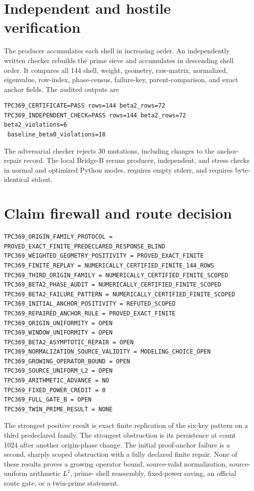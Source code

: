 \documentclass[10pt]{article}
\begin{document}
\section{Independent and hostile verification}

The producer accumulates each shell in increasing order.  An independently
written checker rebuilds the prime sieve and accumulates in descending shell
order.  It compares all 144 shell, weight, geometry, raw-matrix, normalized,
eigenvalue, row-index, phase-census, failure-key, parent-comparison, and exact
anchor fields.  The audited outputs are
\begin{verbatim}
TPC369_CERTIFICATE=PASS rows=144 beta2_rows=72
TPC369_INDEPENDENT_CHECK=PASS rows=144 beta2_rows=72 beta2_violations=6
 baseline_beta0_violations=18
\end{verbatim}
The adversarial checker rejects 30 mutations, including changes to the
anchor-repair record.  The local Bridge-B reruns producer, independent, and
stress checks in normal and optimized Python modes, requires empty stderr,
and requires byte-identical stdout.

\section{Claim firewall and route decision}

\begin{verbatim}
TPC369_ORIGIN_FAMILY_PROTOCOL = PROVED_EXACT_FINITE_PREDECLARED_RESPONSE_BLIND
TPC369_WEIGHTED_GEOMETRY_POSITIVITY = PROVED_EXACT_FINITE
TPC369_FINITE_REPLAY = NUMERICALLY_CERTIFIED_FINITE_144_ROWS
TPC369_THIRD_ORIGIN_FAMILY = NUMERICALLY_CERTIFIED_FINITE_SCOPED
TPC369_BETA2_PHASE_AUDIT = NUMERICALLY_CERTIFIED_FINITE_SCOPED
TPC369_BETA2_FAILURE_PATTERN = NUMERICALLY_CERTIFIED_FINITE_SCOPED
TPC369_INITIAL_ANCHOR_POSITIVITY = REFUTED_SCOPED
TPC369_REPAIRED_ANCHOR_RULE = PROVED_EXACT_FINITE
TPC369_ORIGIN_UNIFORMITY = OPEN
TPC369_WINDOW_UNIFORMITY = OPEN
TPC369_BETA2_ASYMPTOTIC_REPAIR = OPEN
TPC369_NORMALIZATION_SOURCE_VALIDITY = MODELING_CHOICE_OPEN
TPC369_GROWING_OPERATOR_BOUND = OPEN
TPC369_SOURCE_UNIFORM_L2 = OPEN
TPC369_ARITHMETIC_ADVANCE = NO
TPC369_FIXED_POWER_CREDIT = 0
TPC369_FULL_GATE_B = OPEN
TPC369_TWIN_PRIME_RESULT = NONE
\end{verbatim}

The strongest positive result is exact finite replication of the six-key
pattern on a third predeclared family.  The strongest obstruction is its
persistence at count 1024 after another origin-phase change.  The initial
proof-anchor failure is a second, sharply scoped obstruction with a fully
declared finite repair.  None of these results proves a growing operator
bound, source-valid normalization, source-uniform arithmetic $L^2$, prime-
shell reassembly, fixed-power saving, an official route gate, or a twin-prime
statement.
\end{document}
